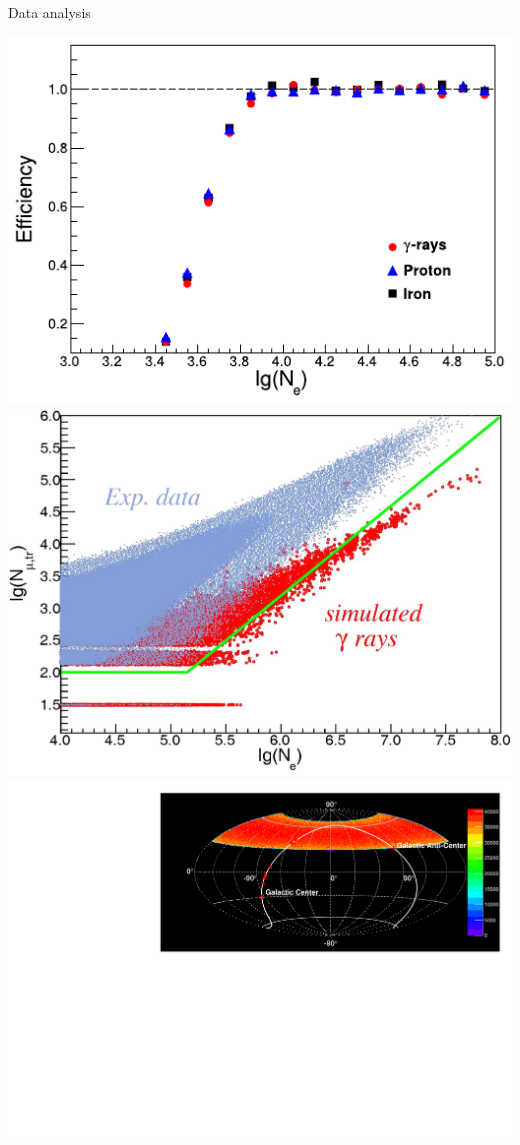\begin{frame}{Data analysis}
\begin{center}
  \includegraphics[height=0.39\textheight]{pics/eff_Ne_Donghwa.pdf}\hspace{1em}
  \includegraphics[height=0.39\textheight]{pics/gamma_cut.png}\\
  \includegraphics[height=0.42\textheight]{pics/Skymap_6srcs_exp.pdf}
\end{center}
\end{frame}

